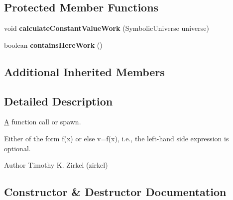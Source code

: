\subsection*{Protected Member Functions}
\begin{DoxyCompactItemize}
\item 
\hypertarget{classedu_1_1udel_1_1cis_1_1vsl_1_1civl_1_1model_1_1common_1_1statement_1_1CommonCallStatement_a0737cbac260100da12ea990e705d0e3f}{}void {\bfseries calculate\+Constant\+Value\+Work} (Symbolic\+Universe universe)\label{classedu_1_1udel_1_1cis_1_1vsl_1_1civl_1_1model_1_1common_1_1statement_1_1CommonCallStatement_a0737cbac260100da12ea990e705d0e3f}

\item 
\hypertarget{classedu_1_1udel_1_1cis_1_1vsl_1_1civl_1_1model_1_1common_1_1statement_1_1CommonCallStatement_a081bd4aa3ccc514f07ebc79eced38c1b}{}boolean {\bfseries contains\+Here\+Work} ()\label{classedu_1_1udel_1_1cis_1_1vsl_1_1civl_1_1model_1_1common_1_1statement_1_1CommonCallStatement_a081bd4aa3ccc514f07ebc79eced38c1b}

\end{DoxyCompactItemize}
\subsection*{Additional Inherited Members}


\subsection{Detailed Description}
\hyperlink{structA}{A} function call or spawn. 

Either of the form f(x) or else v=f(x), i.\+e., the left-\/hand side expression is optional.

\begin{DoxyAuthor}{Author}
Timothy K. Zirkel (zirkel) 
\end{DoxyAuthor}


\subsection{Constructor \& Destructor Documentation}
\hypertarget{classedu_1_1udel_1_1cis_1_1vsl_1_1civl_1_1model_1_1common_1_1statement_1_1CommonCallStatement_a718b25f394a49b0717d2b6f86b226de1}{}
